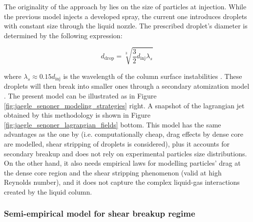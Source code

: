 The originality of the approach by  lies on the size of particles at injection. While the previous model injects a developed spray, the current one introduces droplets with constant size through the liquid nozzle. The prescribed droplet's diameter is determined by the following expression: %

\begin{equation}
\label{eq:ch5_senoner_model_ddrop}
d_\mathrm{drop} = \sqrt[3]{\frac{3}{2} d_\mathrm{inj} \lambda_s}
\end{equation}

where $\lambda_s \approx 0.15 d_\mathrm{inj}$ is the wavelength of the column surface instabilities . These droplets will then break into smaller ones through a secondary atomization model . The present model can be illustrated as in Figure \ref{fig:jaegle_senoner_modeling_strategies} right. A snapshot of the lagrangian jet obtained by this methodology is shown in Figure \ref{fig:jaegle_senoner_lagrangian_fields} bottom. This model has the same advantages as the one by  (i.e. computationally cheap, drag effects by dense core are modelled, shear stripping of droplets is considered), plus it accounts for secondary breakup and does not rely on experimental particles size distributions. On the other hand, it also needs empirical laws for modelling particles' drag at the dense core region and the shear stripping phenomenon (valid at high Reynolds number), and it does not capture the complex liquid-gas interactions created by the liquid column.




\subsubsection*{Semi-empirical model for shear breakup regime }

